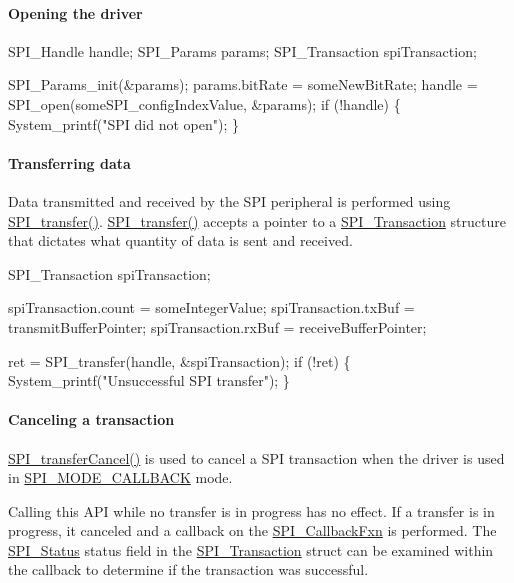 \paragraph*{Opening the driver}


\begin{DoxyCode}
SPI_Handle      handle;
SPI_Params      params;
SPI_Transaction spiTransaction;

SPI_Params_init(&params);
params.bitRate  = someNewBitRate;
handle = SPI_open(someSPI\_configIndexValue, &params);
\textcolor{keywordflow}{if} (!handle) \{
    System\_printf(\textcolor{stringliteral}{"SPI did not open"});
\}
\end{DoxyCode}


\paragraph*{Transferring data}

Data transmitted and received by the S\+P\+I peripheral is performed using \hyperlink{_s_p_i_8h_a989e17f96b54fcc3dc2cac5f8ac6bdb2}{S\+P\+I\+\_\+transfer()}. \hyperlink{_s_p_i_8h_a989e17f96b54fcc3dc2cac5f8ac6bdb2}{S\+P\+I\+\_\+transfer()} accepts a pointer to a \hyperlink{struct_s_p_i___transaction}{S\+P\+I\+\_\+\+Transaction} structure that dictates what quantity of data is sent and received.


\begin{DoxyCode}
SPI_Transaction spiTransaction;

spiTransaction.count = someIntegerValue;
spiTransaction.txBuf = transmitBufferPointer;
spiTransaction.rxBuf = receiveBufferPointer;

ret = SPI_transfer(handle, &spiTransaction);
\textcolor{keywordflow}{if} (!ret) \{
    System\_printf(\textcolor{stringliteral}{"Unsuccessful SPI transfer"});
\}
\end{DoxyCode}


\paragraph*{Canceling a transaction}

\hyperlink{_s_p_i_8h_a6819f7761fc3505c4f885653ff8121f0}{S\+P\+I\+\_\+transfer\+Cancel()} is used to cancel a S\+P\+I transaction when the driver is used in \hyperlink{_s_p_i_8h_ab9ea76c6529d6076eee5e1c4a5a92c6fa5631e69925c47a62a261c78ebbda39fb}{S\+P\+I\+\_\+\+M\+O\+D\+E\+\_\+\+C\+A\+L\+L\+B\+A\+C\+K} mode.

Calling this A\+P\+I while no transfer is in progress has no effect. If a transfer is in progress, it canceled and a callback on the \hyperlink{_s_p_i_8h_a207e2d5a7e7ea5606b6995b6485ca015}{S\+P\+I\+\_\+\+Callback\+Fxn} is performed. The \hyperlink{_s_p_i_8h_a913c57c335166de9caa54b7eb9ad95fb}{S\+P\+I\+\_\+\+Status} status field in the \hyperlink{struct_s_p_i___transaction}{S\+P\+I\+\_\+\+Transaction} struct can be examined within the callback to determine if the transaction was successful.


